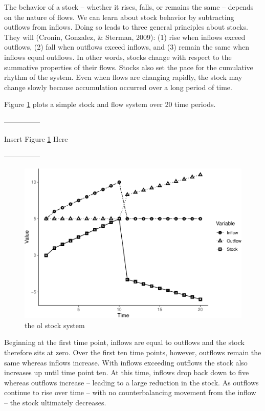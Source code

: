 \documentclass[english,,man]{apa6}
\theoremstyle{definition}
\theoremstyle{definition}
\theoremstyle{definition}
\theoremstyle{remark}
\begin{document}
The behavior of a stock -- whether it rises, falls, or remains the same
-- depends on the nature of flows. We can learn about stock behavior by
subtracting outflows from inflows. Doing so leads to three general
principles about stocks. They will (Cronin, Gonzalez, \& Sterman, 2009):
(1) rise when inflows exceed outflows, (2) fall when outflows exceed
inflows, and (3) remain the same when inflows equal outflows. In other
words, stocks change with respect to the summative properties of their
flows. Stocks also set the pace for the cumulative rhythm of the system.
Even when flows are changing rapidly, the stock may change slowly
because accumulation occurred over a long period of time.

Figure \ref{stocks} plots a simple stock and flow system over 20 time
periods.

\begin{center}

---------------

Insert Figure \ref{stocks} Here

---------------

\end{center}

\begin{figure}
\centering
\includegraphics{figs/unnamed-chunk-5-1.pdf}
\caption{\label{fig:unnamed-chunk-5}the ol stock system\label{stocks}}
\end{figure}

\noindent Beginning at the first time point, inflows are equal to
outflows and the stock therefore sits at zero. Over the first ten time
points, however, outflows remain the same whereas inflows increase. With
inflows exceeding outflows the stock also increases up until time point
ten. At this time, inflows drop back down to five whereas outflows
increase -- leading to a large reduction in the stock. As outflows
continue to rise over time -- with no counterbalancing movement from the
inflow -- the stock ultimately decreases.
\end{document}
